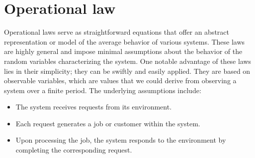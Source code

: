\section{Operational law}

Operational laws serve as straightforward equations that offer an abstract representation or model of the average behavior of various systems. 
These laws are highly general and impose minimal assumptions about the behavior of the random variables characterizing the system.
One notable advantage of these laws lies in their simplicity; they can be swiftly and easily applied. 
They are based on observable variables, which are values that we could derive from observing a system over a finite period.
The underlying assumptions include:
\begin{itemize}
    \item The system receives requests from its environment.
    \item Each request generates a job or customer within the system.
    \item Upon processing the job, the system responds to the environment by completing the corresponding request.
\end{itemize}

